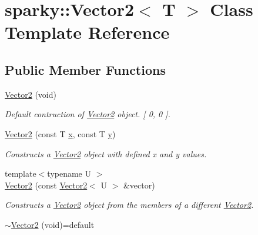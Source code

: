 \hypertarget{classsparky_1_1_vector2}{}\section{sparky\+:\+:Vector2$<$ T $>$ Class Template Reference}
\label{classsparky_1_1_vector2}
\subsection*{Public Member Functions}
\begin{DoxyCompactItemize}
\item 
\hyperlink{classsparky_1_1_vector2_aa6a3f1229ccd787a0622804cd3f2e64c}{Vector2} (void)\hypertarget{classsparky_1_1_vector2_aa6a3f1229ccd787a0622804cd3f2e64c}{}\label{classsparky_1_1_vector2_aa6a3f1229ccd787a0622804cd3f2e64c}

\begin{DoxyCompactList}\small\item\em Default contruction of \hyperlink{classsparky_1_1_vector2}{Vector2} object. \mbox{[} 0, 0 \mbox{]}. \end{DoxyCompactList}\item 
\hyperlink{classsparky_1_1_vector2_a89ef194a6a607f9f48dc9c54e2c498c0}{Vector2} (const T \hyperlink{classsparky_1_1_vector2_a30306429883f3c66f7f0170cab1b3cdf}{x}, const T \hyperlink{classsparky_1_1_vector2_ad56ad07afb25296661c4ded07a5a795c}{y})
\begin{DoxyCompactList}\small\item\em Constructs a \hyperlink{classsparky_1_1_vector2}{Vector2} object with defined x and y values. \end{DoxyCompactList}\item 
{\footnotesize template$<$typename U $>$ }\\\hyperlink{classsparky_1_1_vector2_a8de6450cda4e59e6e54bbca63a38cc00}{Vector2} (const \hyperlink{classsparky_1_1_vector2}{Vector2}$<$ U $>$ \&vector)
\begin{DoxyCompactList}\small\item\em Constructs a \hyperlink{classsparky_1_1_vector2}{Vector2} object from the members of a different \hyperlink{classsparky_1_1_vector2}{Vector2}. \end{DoxyCompactList}\item 
\hyperlink{classsparky_1_1_vector2_a55c70c9bffcbad505f3acf18b93b4e25}{$\sim$\+Vector2} (void)=default\hypertarget{classsparky_1_1_vector2_a55c70c9bffcbad505f3acf18b93b4e25}{}\label{classsparky_1_1_vector2_a55c70c9bffcbad505f3acf18b93b4e25}


\end{DoxyCompactItemize}
